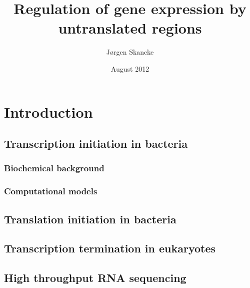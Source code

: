 \documentclass[]{ntnuthesis}
\title{Regulation of gene expression by untranslated regions}
\author{J\o rgen Skancke}
\date{August 2012}
\begin{document}
 

\frontmatter


%


\mainmatter

\chapter{Introduction}



\section{Transcription initiation in bacteria}
\subsection{Biochemical background}

\subsection{Computational models}


\section{Translation initiation in bacteria}


\section{Transcription termination in eukaryotes}

\section{High throughput RNA sequencing}

\end{document}
